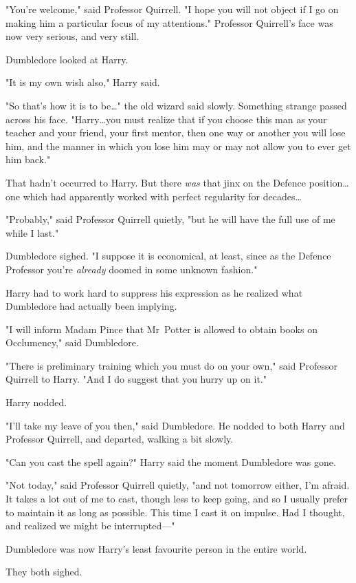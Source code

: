 "You're welcome," said Professor Quirrell. "I hope you will not object if I go
on making him a particular focus of my attentions." Professor Quirrell's face
was now very serious, and very still.

Dumbledore looked at Harry.

"It is my own wish also," Harry said.

"So that's how it is to be…" the old wizard said slowly. Something
strange passed across his face. "Harry…you must realize that if you
choose this man as your teacher and your friend, your first mentor, then one
way or another you will lose him, and the manner in which you lose him may or
may not allow you to ever get him back."

That hadn't occurred to Harry. But there \emph{was} that jinx on the Defence
position…one which had apparently worked with perfect regularity for
decades…

"Probably," said Professor Quirrell quietly, "but he will have the full use of
me while I last."

Dumbledore sighed. "I suppose it is economical, at least, since as the Defence
Professor you're \emph{already} doomed in some unknown fashion."

Harry had to work hard to suppress his expression as he realized what
Dumbledore had actually been implying.

"I will inform Madam Pince that Mr~Potter is allowed to obtain books on
Occlumency," said Dumbledore.

"There is preliminary training which you must do on your own," said Professor
Quirrell to Harry. "And I do suggest that you hurry up on it."

Harry nodded.

"I'll take my leave of you then," said Dumbledore. He nodded to both Harry and
Professor Quirrell, and departed, walking a bit slowly.

"Can you cast the spell again?" Harry said the moment Dumbledore was gone.

"Not today," said Professor Quirrell quietly, "and not tomorrow either, I'm
afraid. It takes a lot out of me to cast, though less to keep going, and so I
usually prefer to maintain it as long as possible. This time I cast it on
impulse. Had I thought, and realized we might be interrupted—"

Dumbledore was now Harry's least favourite person in the entire world.

They both sighed.

